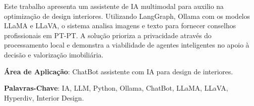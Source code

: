 \documentclass[a4paper,12pt]{scrreprt}
\begin{document}

\makecover



\renewenvironment{abstract}
 {\par\noindent\textbf{\Large\abstractname}\par\bigskip}
 {}

\begin{flushleft}
\begin{abstract}
    Este trabalho apresenta um assistente de IA multimodal para auxilio na optimização de design interiores. Utilizando LangGraph, Ollama com os modelos LLaMA e LLaVA, o sistema analisa imagens e texto para fornecer conselhos profissionais em PT-PT. A solução prioriza a privacidade através do processamento local e demonstra a viabilidade de agentes inteligentes no apoio à decisão e valorização imobiliária.
    \par \textbf{Área de Aplicação}: ChatBot assistente com IA para design de interiores.
    \par \textbf{Palavras-Chave}: IA, LLM, Python, Ollama, ChatBot, LLaMA, LLaVA, Hyperdiv, Interior Design.
\end{abstract}
\end{flushleft}

\pagebreak



\renewcommand{\contentsname}{Índice}

\tableofcontents

\pagebreak

\listoffigures

\pagebreak
\end{document}
